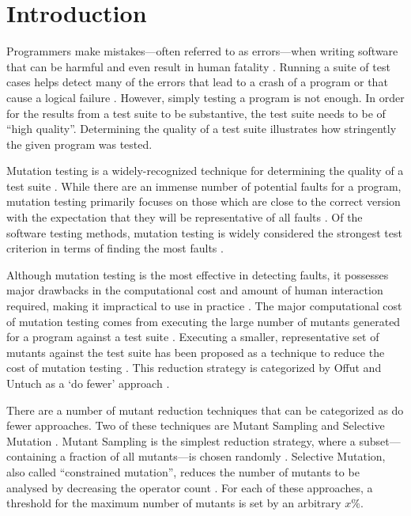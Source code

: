 \section{Introduction}
Programmers make mistakes---often referred to as errors---when writing software
that can be harmful and even result in human fatality \cite{vicente2003programming}.
Running a suite of test cases helps detect many of the errors
that lead to a crash of a program or that cause a logical failure \cite{wagner2005comparing}.
However, simply testing a program is not enough. In order for the results
from a test suite to be substantive, the test suite needs to be of ``high quality''.
Determining the quality of a test suite illustrates how stringently the given
program was tested.

Mutation testing is a widely-recognized technique for determining the quality
of a test suite \cite{gopinath2015mutation}. While there are an immense number
of potential faults for a program, mutation testing primarily focuses on those
which are close to the correct version with the expectation that they will
be representative of all faults \cite{jia2011analysis}.
Of the software testing methods, mutation testing is widely considered the strongest
test criterion in terms of finding the most faults \cite{ammann2008introduction}.

Although mutation testing is the most effective in detecting faults, it possesses
major drawbacks in the computational cost and amount of human interaction required, making it
impractical to use in practice \cite{gopinath2015mutation, wong1995reducing, gopinath2015empirical}.
The major computational cost of mutation testing comes from executing the large number of mutants generated for a
program against a test suite \cite{offutt1993experimental}. Executing a smaller, representative
set of mutants against the test suite has been proposed as a technique to reduce
the cost of mutation testing \cite{jia2011analysis, wong1995reducing, offutt1993experimental, offutt2001mutation}.
This reduction strategy is categorized by Offut and Untuch as a `do fewer' approach \cite{offutt2001mutation}.

There are a number of mutant reduction techniques that can be categorized as do fewer approaches. Two of these techniques are Mutant Sampling and Selective Mutation \cite{jia2011analysis, wong1995reducing, offutt1993experimental}.
Mutant Sampling is the simplest reduction strategy, where a subset---containing a fraction of all mutants---is
chosen randomly \cite{wong1995reducing}. Selective Mutation, also called ``constrained mutation'',
reduces the number of mutants to be analysed by decreasing the operator count \cite{jia2011analysis, offutt1993experimental, mathur1991performance}.
For each of these approaches, a threshold for the maximum number of mutants is set by an arbitrary \(x\%\).

